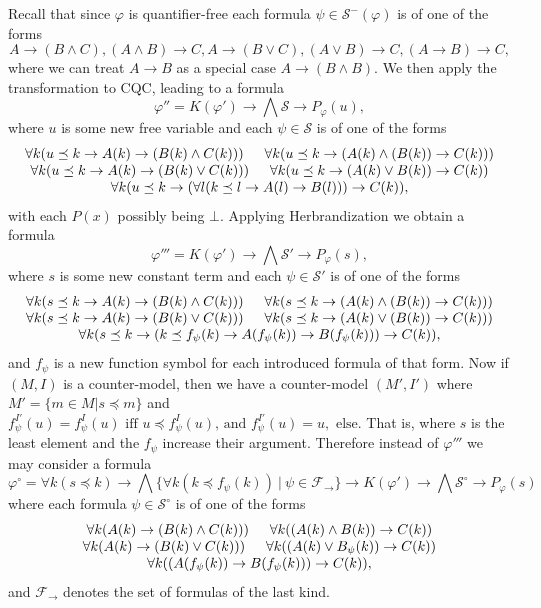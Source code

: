 \documentclass[runningheads]{llncs}
\begin{document}
Recall that since $\varphi$ is quantifier-free each formula $\psi\in\mathcal S^-(\varphi)$ is of one of the forms
$$A\to (B\wedge C), (A\wedge B)\to C, A\to (B\vee C), (A\vee B)\to C, (A\to B)\to C,$$
where we can treat $A\to B$ as a special case $A\to (B\wedge B)$. We then apply the transformation to CQC, leading to a formula
$$\varphi'' = K(\varphi')\to\bigwedge  \mathcal S\to P_\varphi(u),$$
where $u$ is some new free variable and each $\psi\in\mathcal S$ is of one of the forms
$$\begin{matrix}
	\forall k(u\preceq k\to A(k)\to (B(k)\wedge C(k)))\indent  \forall k(u\preceq k\to (A(k)\wedge (B(k))\to C(k)))\\
	\forall k(u\preceq k\to A(k)\to (B(k)\vee C(k)))\indent \forall k(u\preceq k\to (A(k)\vee B(k))\to C(k))\\
	\forall k(u\preceq k\to (\forall l(k\preceq l \to A(l)\to B(l)))\to C(k)),
\end{matrix}$$
with each $P(x)$ possibly being $\bot$. Applying Herbrandization we obtain a formula
$$\varphi''' = K(\varphi')\to \bigwedge \mathcal S'\to P_\varphi(s),$$
where $s$ is some new constant term and each $\psi\in\mathcal S'$ is of one of the forms
$$\begin{matrix}
	\forall k(s\preceq k\to A(k)\to (B(k)\wedge C(k)))\indent \forall k(s\preceq k\to (A(k)\wedge (B(k))\to C(k)))\\
	\forall k(s\preceq k\to A(k)\to (B(k)\vee C(k)))\indent \forall k(s\preceq k\to (A(k)\vee (B(k))\to C(k)))\\
	\forall k(s\preceq k\to (k\preceq f_\psi(k) \to A(f_\psi(k))\to B(f_\psi(k)))\to C(k)),\\
\end{matrix}$$
and $f_\psi$ is a new function symbol for each introduced formula of that form. Now if $(M, I)$ is a counter-model, then we have a counter-model $(M',I')$ where $M' = \{m\in M|s\preceq m\}$ and
$f_\psi^{I'}(u) = f^I_\psi(u) \text{ iff $u\preceq f^{I}_\psi(u)$, and $f_\psi^{I'}(u) = u,$ else.}$ That is, where $s$ is the least element and the $f_\psi$ increase their argument. Therefore instead of $\varphi'''$ we may consider a formula $$\varphi^\circ = \forall k(s\preceq k)\to \bigwedge\{\forall k(k\preceq f_\psi(k))\:|\:\psi\in\mathcal F_\to\}\to K(\varphi')\to \bigwedge \mathcal S^\circ\to P_\varphi(s)$$ where each formula $\psi\in\mathcal S^\circ$ is of one of the forms
$$\begin{matrix}
	\forall k(A(k)\to (B(k)\wedge C(k)))\indent\forall k((A(k)\wedge B(k))\to C(k))\\
	\forall k(A(k)\to (B(k)\vee C(k)))\indent\forall k((A(k)\vee B_\psi(k))\to C(k))\\
	\forall k((A(f_\psi(k))\to B(f_\psi(k)))\to C(k)),
\end{matrix}$$
and $\mathcal F_\to$ denotes the set of formulas of the last kind.
\end{document}
